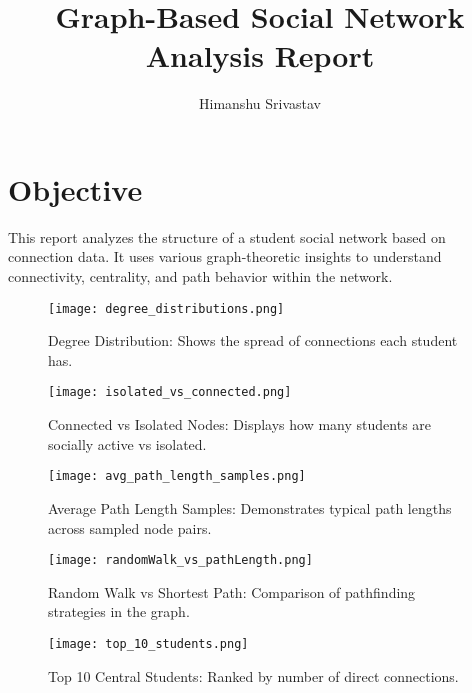 \documentclass[10pt]{article}
\title{Graph-Based Social Network Analysis Report}
\author{Himanshu Srivastav}
\date{}
\begin{document}
\maketitle
\small

\section*{Objective}
This report analyzes the structure of a student social network based on connection data. It uses various graph-theoretic insights to understand connectivity, centrality, and path behavior within the network.

\vspace{1em}

\begin{multicols}{2}

\begin{figure}[H]
    \centering
    \texttt{[image: degree\_distributions.png]}
    \caption{Degree Distribution: Shows the spread of connections each student has.}
\end{figure}

\begin{figure}[H]
    \centering
    \texttt{[image: isolated\_vs\_connected.png]}
    \caption{Connected vs Isolated Nodes: Displays how many students are socially active vs isolated.}
\end{figure}

\begin{figure}[H]
    \centering
    \texttt{[image: avg\_path\_length\_samples.png]}
    \caption{Average Path Length Samples: Demonstrates typical path lengths across sampled node pairs.}
\end{figure}

\columnbreak

\begin{figure}[H]
    \centering
    \texttt{[image: randomWalk\_vs\_pathLength.png]}
    \caption{Random Walk vs Shortest Path: Comparison of pathfinding strategies in the graph.}
\end{figure}

\begin{figure}[H]
    \centering
    \texttt{[image: top\_10\_students.png]}
    \caption{Top 10 Central Students: Ranked by number of direct connections.}
\end{figure}

\end{multicols}
\end{document}
